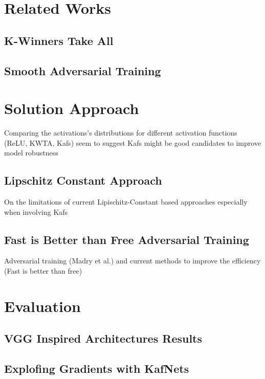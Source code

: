 \documentclass[LaM,binding=0.6cm]{./packages/sapthesis/sapthesis}
\begin{document}
\chapter{Related Works}

    \section{K-Winners Take All}
    \section{Smooth Adversarial Training}


\chapter{Solution Approach}
 
    Comparing the activations's distributions for different activation functions (ReLU, KWTA, Kafs) 
    seem to suggest Kafs might be good candidates to improve model robustness 

    \section{Lipschitz Constant Approach}

        On the limitations of current Lipischitz-Constant based approaches especially when involving Kafs

    \section{Fast is Better than Free Adversarial Training}

        Adversarial training (Madry et al.) and current methods to improve the efficiency (Fast is better than free)


\chapter{Evaluation}

    \section{VGG Inspired Architectures Results}

    \section{Explofing Gradients with KafNets}
\end{document}
